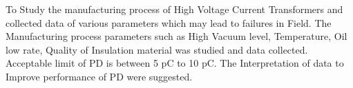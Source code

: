 To Study the manufacturing process of High Voltage Current Transformers and collected data of various parameters which may lead to failures in Field. The Manufacturing process parameters such as High Vacuum level, Temperature, Oil low rate, Quality of Insulation material was studied and data collected. Acceptable limit of PD is between 5 pC to 10 pC. The Interpretation of data to Improve performance of PD were suggested.\setlength{\parskip}{0em}

%
%
%
%
%
%
%
